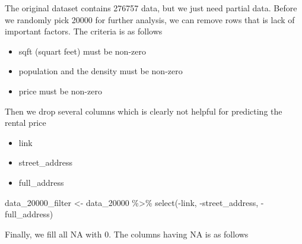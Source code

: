 \documentclass[
]{article}
\newenvironment{Shaded}{\begin{snugshade}}{\end{snugshade}}
\newcommand{\DecValTok}[1]{\textcolor[rgb]{0.00,0.00,0.81}{#1}}
\newcommand{\FunctionTok}[1]{\textcolor[rgb]{0.00,0.00,0.00}{#1}}
\newcommand{\NormalTok}[1]{#1}
\newcommand{\OtherTok}[1]{\textcolor[rgb]{0.56,0.35,0.01}{#1}}
\newcommand{\SpecialCharTok}[1]{\textcolor[rgb]{0.00,0.00,0.00}{#1}}
\providecommand{\tightlist}{%
  \setlength{\itemsep}{0pt}\setlength{\parskip}{0pt}}
\begin{document}
The original dataset contains 276757 data, but we just need partial
data. Before we randomly pick 20000 for further analysis, we can remove
rows that is lack of important factors. The criteria is as follows

\begin{itemize}
\tightlist
\item
  sqft (squart feet) must be non-zero
\item
  population and the density must be non-zero
\item
  price must be non-zero
\end{itemize}

\begin{Shaded}
\end{Shaded}

Then we drop several columns which is clearly not helpful for predicting
the rental price

\begin{itemize}
\tightlist
\item
  link
\item
  street\_address
\item
  full\_address
\end{itemize}

\begin{Shaded}
\begin{Highlighting}[]
\NormalTok{data\_20000\_filter }\OtherTok{\textless{}{-}}
\NormalTok{  data\_20000 }\SpecialCharTok{\%\textgreater{}\%}
  \FunctionTok{select}\NormalTok{(}\SpecialCharTok{{-}}\NormalTok{link, }\SpecialCharTok{{-}}\NormalTok{street\_address, }\SpecialCharTok{{-}}\NormalTok{full\_address)}
\end{Highlighting}
\end{Shaded}

Finally, we fill all NA with 0. The columns having NA is as follows
\end{document}
